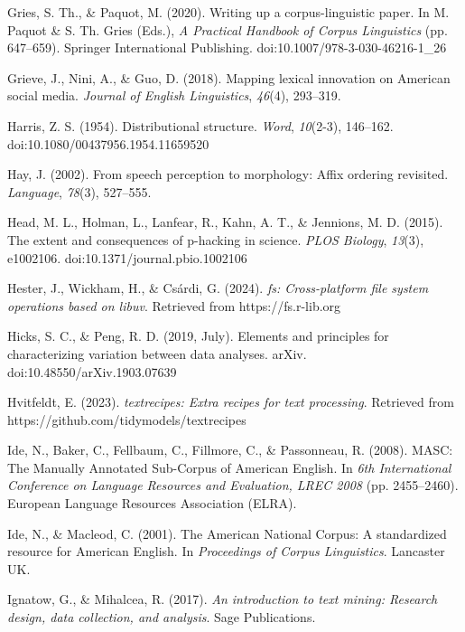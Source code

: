 \documentclass[
  letterpaper,
  krantz1]{latex/krantz-mod}
\newlength{\cslhangindent}
\newenvironment{CSLReferences}[2] %
 {\begin{list}{}{%
  \setlength{\itemindent}{0pt}
  \setlength{\leftmargin}{0pt}
  \setlength{\parsep}{0pt}
  \ifodd #1
   \setlength{\leftmargin}{\cslhangindent}
   \setlength{\itemindent}{-1\cslhangindent}
  \fi
  \setlength{\itemsep}{#2\baselineskip}}}
 {\end{list}}
\theoremstyle{definition}
\theoremstyle{definition}
\theoremstyle{remark}
\begin{document}
\begin{CSLReferences}{1}{0}
Gries, S. Th., \& Paquot, M. (2020). Writing up a corpus-linguistic
paper. In M. Paquot \& S. Th. Gries (Eds.), \emph{A {Practical Handbook}
of {Corpus Linguistics}} (pp. 647--659). Springer International
Publishing. doi:10.1007/978-3-030-46216-1\_26

Grieve, J., Nini, A., \& Guo, D. (2018). Mapping lexical innovation on
{American} social media. \emph{Journal of English Linguistics},
\emph{46}(4), 293--319.

Harris, Z. S. (1954). Distributional structure. \emph{Word},
\emph{10}(2-3), 146--162. doi:10.1080/00437956.1954.11659520

Hay, J. (2002). From speech perception to morphology: {Affix} ordering
revisited. \emph{Language}, \emph{78}(3), 527--555.

Head, M. L., Holman, L., Lanfear, R., Kahn, A. T., \& Jennions, M. D.
(2015). The extent and consequences of p-hacking in science. \emph{PLOS
Biology}, \emph{13}(3), e1002106. doi:10.1371/journal.pbio.1002106

Hester, J., Wickham, H., \& Csárdi, G. (2024). \emph{{fs}:
Cross-platform file system operations based on libuv}. Retrieved from
https://fs.r-lib.org

Hicks, S. C., \& Peng, R. D. (2019, July). Elements and principles for
characterizing variation between data analyses. arXiv.
doi:10.48550/arXiv.1903.07639

Hvitfeldt, E. (2023). \emph{{textrecipes}: Extra recipes for text
processing}. Retrieved from https://github.com/tidymodels/textrecipes

Ide, N., Baker, C., Fellbaum, C., Fillmore, C., \& Passonneau, R.
(2008). {MASC}: {The Manually Annotated Sub-Corpus} of {American
English}. In \emph{6th {International Conference} on {Language
Resources} and {Evaluation}, {LREC} 2008} (pp. 2455--2460). European
Language Resources Association (ELRA).

Ide, N., \& Macleod, C. (2001). The {American National Corpus}: A
standardized resource for {American English}. In \emph{Proceedings of
{Corpus Linguistics}}. Lancaster UK.

Ignatow, G., \& Mihalcea, R. (2017). \emph{An introduction to text
mining: {Research} design, data collection, and analysis}. Sage
Publications.


\end{CSLReferences}
\end{document}
